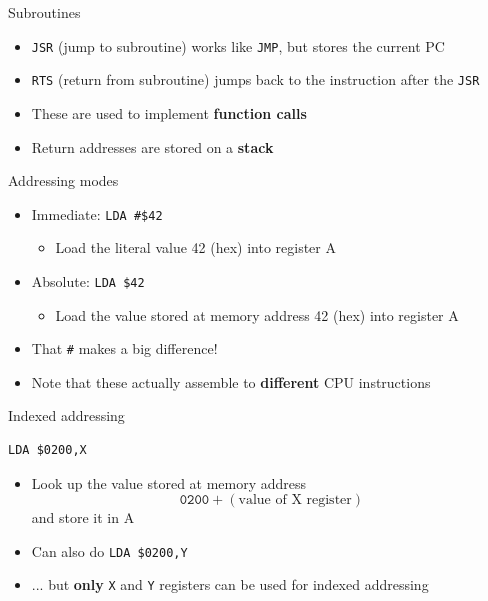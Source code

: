 \begin{frame}[fragile]{Subroutines}
	\begin{itemize}
		\pause\item \lstinline{JSR} (jump to subroutine) works like \lstinline{JMP}, but stores the current PC
		\pause\item \lstinline{RTS} (return from subroutine) jumps back to the instruction
			after the \lstinline{JSR}
		\pause\item These are used to implement \textbf{function calls}
		\pause\item Return addresses are stored on a \textbf{stack}
	\end{itemize}
\end{frame}

\begin{frame}[fragile]{Addressing modes}
	\begin{itemize}
		\pause\item Immediate: \lstinline{LDA #$42}
			\begin{itemize}
				\pause\item Load the literal value 42 (hex) into register A
			\end{itemize}
		\pause\item Absolute: \lstinline{LDA $42}
			\begin{itemize}
				\pause\item Load the value stored at memory address 42 (hex) into register A
			\end{itemize}
		\pause\item That \lstinline{#} makes a big difference!
		\pause\item Note that these actually assemble to \textbf{different} CPU instructions
	\end{itemize}
\end{frame}

\begin{frame}[fragile]{Indexed addressing}
	\begin{lstlisting}
LDA $0200,X
	\end{lstlisting}
	\begin{itemize}
		\pause\item Look up the value stored at memory address
			$$ \texttt{0200} + (\text{value of X register}) $$
			and store it in A
		\pause\item Can also do \lstinline{LDA $0200,Y}
		\pause\item ... but \textbf{only} \lstinline{X} and \lstinline{Y} registers can be used for indexed addressing
	\end{itemize}
\end{frame}

